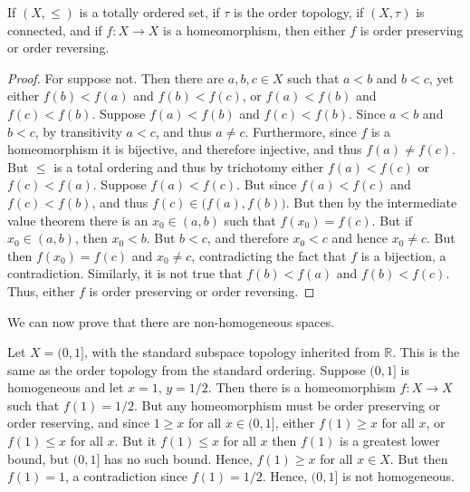 \documentclass{article}                                                        %
\begin{document}
        \begin{theorem}
                If $(X,\leq)$ is a totally ordered set, if $\tau$ is the order
                topology, if $(X,\tau)$ is connected, and if $f:X\rightarrow{X}$
                is a homeomorphism, then either $f$ is order preserving or
                order reversing.
        \end{theorem}
        \begin{proof}
                For suppose not. Then there are $a,b,c\in{X}$ such that
                $a<b$ and $b<c$, yet either $f(b)<f(a)$ and $f(b)<f(c)$, or
                $f(a)<f(b)$ and $f(c)<f(b)$. Suppose $f(a)<f(b)$ and
                $f(c)<f(b)$. Since $a<b$ and $b<c$, by transitivity $a<c$, and
                thus $a\ne{c}$. Furthermore, since $f$ is a homeomorphism it is
                bijective, and therefore injective, and thus $f(a)\ne{f}(c)$.
                But $\leq$ is a total ordering and thus by trichotomy either
                $f(a)<f(c)$ or $f(c)<f(a)$. Suppose $f(a)<f(c)$. But since
                $f(a)<f(c)$ and $f(c)<f(b)$, and thus
                $f(c)\in\big(f(a),f(b)\big)$. But then by the intermediate value
                theorem there is an $x_{0}\in(a,b)$ such that $f(x_{0})=f(c)$.
                But if $x_{0}\in(a,b)$, then $x_{0}<b$. But $b<c$, and therefore
                $x_{0}<c$ and hence $x_{0}\ne{c}$. But then $f(x_{0})=f(c)$ and
                $x_{0}\ne{c}$, contradicting the fact that $f$ is a bijection,
                a contradiction. Similarly, it is not true that $f(b)<f(a)$ and
                $f(b)<f(c)$. Thus, either $f$ is order preserving or order
                reversing.
        \end{proof}
        We can now prove that there are non-homogeneous spaces.
        \begin{example}
                Let $X=(0,1]$, with the standard subspace topology inherited
                from $\mathbb{R}$. This is the same as the order topology from
                the standard ordering. Suppose $(0,1]$ is homogeneous and let
                $x=1$, $y=1/2$. Then there is a homeomorphism
                $f:X\rightarrow{X}$ such that $f(1)=1/2$. But any homeomorphism
                must be order preserving or order reserving, and since
                $1\geq{x}$ for all $x\in(0,1]$, either $f(1)\geq{x}$ for all
                $x$, or $f(1)\leq{x}$ for all $x$. But it $f(1)\leq{x}$ for all
                $x$ then $f(1)$ is a greatest lower bound, but $(0,1]$ has no
                such bound. Hence, $f(1)\geq{x}$ for all $x\in{X}$. But then
                $f(1)=1$, a contradiction since $f(1)=1/2$. Hence, $(0,1]$ is
                not homogeneous.
        \end{example}
\end{document}
